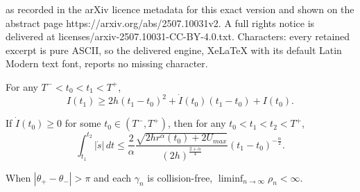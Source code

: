 \documentclass[10pt,a4paper]{amsart}
\newcommand{\al}{\alpha}
\newcommand{\gm}{\gamma}
\newcommand{\tht}{\theta}
\begin{document}
as recorded in the arXiv licence metadata for this exact version and shown on the abstract page https://arxiv.org/abs/2507.10031v2. A full rights notice is delivered at licenses/arxiv-2507.10031-CC-BY-4.0.txt. Characters: every retained excerpt is pure ASCII, so the delivered engine, XeLaTeX with its default Latin Modern text font, reports no missing character.
\begin{lem}
\label{lem;I-ge} For any $T^-<t_0< t_1 <T^+$, 
\begin{equation}
\label{eq;I-ge} I(t_1) \ge 2h(t_1 -t_0)^2 + \dot{I}(t_0)(t_1 -t_0) + I(t_0).  
\end{equation}
\end{lem}

\begin{lem}
\label{lem;|s-dot|} If $\dot{I}(t_0) \ge 0$ for some $t_0 \in (T^-, T^+)$, then for any $t_0 < t_1 < t_2 < T^+$, 
\begin{equation}
\label{eq;int-s-dot} \int_{t_1}^{t_2} |\dot{s}| \,dt \le  \frac{2}{\al} \frac{\sqrt{2h r^{\al}(t_0)+2U_{max}}}{(2h )^{\frac{2 +\al}{4}}}(t_1-t_0)^{-\frac{\al}{2}} .
\end{equation}
\end{lem}

\begin{lem} \label{lem;rho-bound}
When $|\tht_+ -\tht_-| >\pi$ and each $\gm_n$ is collision-free, $\liminf_{n \to \infty} \rho_n <\infty.$
\end{lem}
\end{document}
